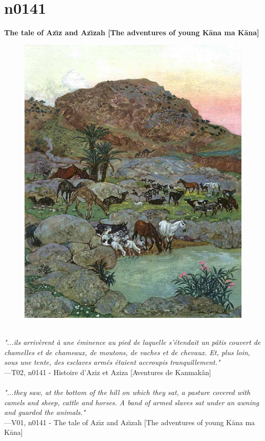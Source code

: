 \documentclass[../Carre_nights.tex]{subfiles}
\begin{document}
\newpage

\section{n0141}
\textbf{\Large{The tale of Az\={\i}z and Az\={\i}zah [The adventures of young K\=ana ma K\=ana]}} \\

\begin{figure}[ht]
\centering
\includegraphics[height=\figsize]{illustrations/volume_2/T02, n0141 - Histoire d’Aziz et Aziza [Aventures de Kanmakân].jpg}
\end{figure}

\textit{\\
"...ils arrivèrent à une éminence au pied de laquelle s’étendait un pâtis couvert de chamelles et de chameaux, de moutons, de vaches et de chevaux. Et, plus loin, sous une tente, des esclaves armés étaient accroupis tranquillement."} \\
—T02, n0141 - Histoire d’Aziz et Aziza [Aventures de Kanmakân] \\~\\
\textit{"...they saw, at the bottom of the hill on which they sat, a pasture covered with camels and sheep, cattle and horses. A band of armed slaves sat under an awning and guarded the animals."} \\
—V01, n0141 - The tale of Az\={\i}z and Az\={\i}zah [The adventures of young K\=ana ma K\=ana]
\end{document}
